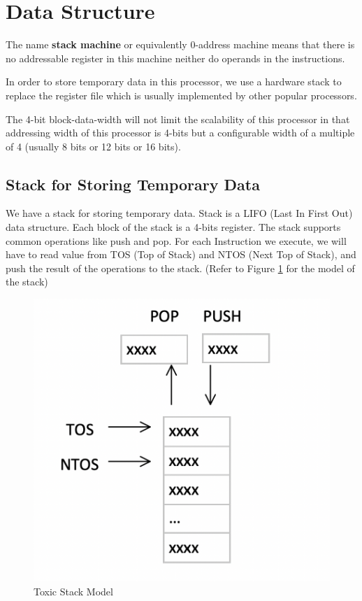 \documentclass[11pt]{book}
\begin{document}
    \section{Data Structure}
    The name \textbf{stack machine} or equivalently 0-address machine means that 
    there is no addressable register in this machine neither do operands in the instructions. \par
    
    In order to store temporary data in this processor, we use a hardware stack to replace 
    the register file which is usually implemented by other popular processors. \par

    The 4-bit block-data-width will not limit the scalability of this processor in that addressing
    width of this processor is 4-bits but a configurable width of a multiple of 4 
    (usually 8 bits or 12 bits or 16 bits).

    \subsection{Stack for Storing Temporary Data}
    We have a stack for storing temporary data. 
    Stack is a LIFO (Last In First Out) data structure.
    Each block of the stack is a 4-bits register.
    The stack supports common operations like push and pop. For each Instruction we execute,
    we will have to read value from TOS (Top of Stack) and NTOS (Next Top of Stack), 
    and push the result of the operations to the stack.
    (Refer to Figure \ref{figure:stack_model} for the model of the stack)
    \begin{figure}[h!]
        \centering
        \includegraphics[scale=0.6]{Toxic_Stack_Model.png}
        \caption{Toxic Stack Model}
        \label{figure:stack_model}
    \end{figure}
\end{document}
